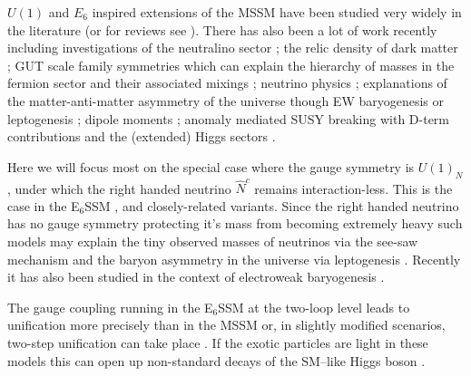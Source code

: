 \documentclass[preprint,amsmath,amssymb,aps,superscriptaddress,prd,showpacs,floatfix,nofootinbib]{revtex4-1}
\begin{document}
$U(1)$ and $E_6$ inspired extensions of the MSSM have been studied
very widely in the literature \cite{Gunion:1989we, Gunion:1992hs,
  Binetruy:1985xm, Ellis:1986yg, Ibanez:1986si, Gunion:1986ky,
  Haber:1986gz, Baer:1987eb, Gunion:1987jd, Grifols:1986vr,
  Ellis:1986ip, Morris:1987fm, Drees:1987tp, Ma:1995xk,
  Suematsu:1997tv, Suematsu:1997qt, Suematsu:1997au, Keith:1996fv,
  Keith:1997zb, Gherghetta:1996yr, Demir:1998dk, Langacker:1998tc,
  Hambye:2000bn, Ma:2000jf} (or for reviews see
\cite{Hewett:1988xc,Langacker:2008yv}).  There has also been a lot of
work recently including investigations of the neutralino sector
\cite{Hesselbach:2001ri, Barger:2005hb, Choi:2006fz,
  Barger:2007nv}; the relic density of dark matter
\cite{Kalinowski:2008iq}; GUT scale family symmetries which can
explain the hierarchy of masses in the fermion sector and their
associated mixings \cite{Stech:2008wd}; neutrino physics
\cite{Kang:2004ix}; explanations of the matter-anti-matter asymmetry
of the universe though EW baryogenesis or leptogenesis
\cite{Hambye:2000bn,Ma:2000jf,Kang:2004pp}; dipole moments
\cite{GutierrezRodriguez:2006hb}; anomaly mediated SUSY breaking with
D-term contributions \cite{Asano:2008ju} and the (extended) Higgs
sectors \cite{Daikoku:2000ep,Ham:2008xf}.



Here we will focus most on the special case where the gauge symmetry
is $U(1)_N$, under which the right handed neutrino $\hat{N}^c$ remains
interaction-less. This is the case in the E$_6$SSM
\cite{King:2005jy,King:2005my,Athron:2010zz}, and closely-related
variants\cite{Howl:2007zi, Braam:2009fi, Braam:2010sy, Hall:2011zq,
  Nevzorov:2012hs, Athron:2014pua}.  Since the right handed neutrino
has no gauge symmetry protecting it's mass from becoming extremely
heavy such models may explain the tiny observed masses of neutrinos
via the see-saw mechanism and the baryon asymmetry in the universe via
leptogenesis \cite{Hambye:2000bn,King:2008qb, King:2008gw}.  Recently
it has also been studied in the context of electroweak baryogenesis
\cite{Chao:2014hya}.

The gauge coupling running in the E$_6$SSM at the two-loop level leads
to unification more precisely than in the MSSM \cite{King:2007uj} or,
in slightly modified scenarios, two-step unification can take place
\cite{Howl:2007hq,Howl:2007zi}. If the exotic particles are light in
these models this can open up non-standard decays of the SM--like
Higgs boson \cite{Hall:2010ix,Nevzorov:2013tta,Athron:2014pua}. 
\end{document}
